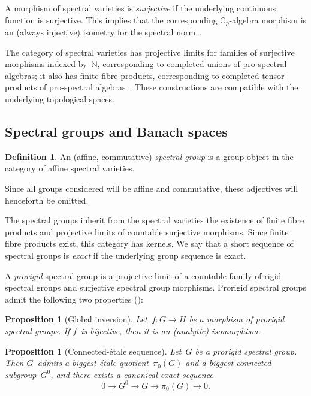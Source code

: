 \documentclass{article}
\newtheorem{prop}[thm]{Proposition}
\theoremstyle{definition}
\newtheorem{df}[thm]{Definition}
\def\Cp{{ℂ_p}}
\begin{document}
A morphism of spectral varieties is \emph{surjective} if the underlying
continuous function is surjective. This implies that the corresponding
$\Cp$-algebra morphism is an (always injective) isometry for the spectral
norm~\cite[1.6.1]{These}.

The category of spectral varieties has projective limits for families of
surjective morphisms indexed by~$ℕ$, corresponding to completed unions of
pro-spectral algebras; it also has finite fibre products, corresponding to
completed tensor products of pro-spectral
algebras~\cite[1.6.5,1.6.7]{These}. These constructions are compatible
with the underlying topological spaces.
\subsection{Spectral groups and Banach spaces}

\begin{df}
An (affine, commutative) \emph{spectral group} is a group object in the
category of affine spectral varieties.
\end{df}

Since all groups considered will be affine and commutative, these
adjectives will henceforth be omitted.

The spectral groups inherit from the spectral varieties the existence of
finite fibre products and projective limits of countable surjective
morphisms. Since finite fibre products exist, this category has
kernels. We say that a short sequence of spectral groups is \emph{exact}
if the underlying group sequence is exact.

A \emph{prorigid} spectral group is a projective limit of a countable
family of rigid spectral groups and surjective spectral group morphisms.
Prorigid spectral groups admit the following two properties
(\cite[3.4.4 and 3.4.9]{These}):

\begin{prop}[Global inversion]
Let~$f: G → H$ be a morphism
of prorigid spectral groups. If $f$~is bijective, then it is an
(analytic) isomorphism.
\end{prop}%

\begin{prop}[Connected-étale sequence]
Let~$G$ be a prorigid spectral group.
Then $G$~admits a biggest étale quotient~$π_0(G)$ and a biggest connected
subgroup~$G^0$, and there exists a canonical exact sequence
\[ 0 → G^0 → G → π_0(G) → 0. \]
\end{prop}%
\end{document}
